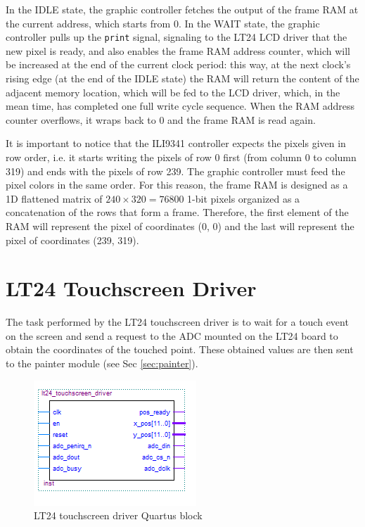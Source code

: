 \documentclass[11pt]{report}
\begin{document}
In the IDLE state, the graphic controller fetches the output of the frame RAM at the current address, which starts from 0. In the WAIT state, the graphic controller pulls up the \texttt{print} signal, signaling to the LT24 LCD driver that the new pixel is ready, and also enables the frame RAM address counter, which will be increased at the end of the current clock period: this way, at the next clock's rising edge (at the end of the IDLE state) the RAM will return the content of the adjacent memory location, which will be fed to the LCD driver, which, in the mean time, has completed one full write cycle sequence. When the RAM address counter overflows, it wraps back to 0 and the frame RAM is read again.

It is important to notice that the ILI9341 controller expects the pixels given in row order, i.e. it starts writing the pixels of row 0 first (from column 0 to column 319) and ends with the pixels of row 239. The graphic controller must feed the pixel colors in the same order. For this reason, the frame RAM is designed as a 1D flattened matrix of $240\times320=76800$ 1-bit pixels organized as a concatenation of the rows that form a frame. Therefore, the first element of the RAM will represent the pixel of coordinates (0, 0) and the last will represent the pixel of coordinates (239, 319).

\section{LT24 Touchscreen Driver}\label{sec:touchscreen_driver}
The task performed by the LT24 touchscreen driver is to wait for a touch event on the screen and send a request to the ADC mounted on the LT24 board to obtain the coordinates of the touched point. These obtained values are then sent to the painter module (see Sec \ref{sec:painter}).

\begin{figure}[!h]
    \centering
    \includegraphics[width=0.5\linewidth]{images/graphic_interface_design/LT24_touchscreen_driver/touchscreen_driver_quartus_block.png}
    \caption{LT24 touchscreen driver Quartus block}
    \label{fig:touchscreen_driver_quartus_block}
\end{figure}
\end{document}
